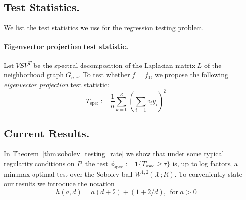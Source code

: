 \documentclass{article}
\newcommand{\1}{\mathbf{1}}
\theoremstyle{alden}
\theoremstyle{aldenthm}
\theoremstyle{definition}
\theoremstyle{remark}
\begin{document}
\subsection{Test Statistics.}
We list the test statistics we use for the regression testing problem.

\paragraph{Eigenvector projection test statistic.}
Let $VSV^T$ be the spectral decomposition of the Laplacian matrix $L$ of the neighborhood graph $G_{n,r}$. To test whether $f = f_0$, we propose the following \emph{eigenvector projection} test statistic:
\begin{equation}
\label{eqn:graph_spectral_projections}
T_{\mathrm{spec}} := \frac{1}{n} \sum_{k = 0}^{\kappa} \left(\sum_{i = 1} v_i y_i\right)^2
\end{equation}

\subsection{Current Results.}

In Theorem~\ref{thm:sobolev_testing_rate} we show that under some typical regularity conditions on $P$, the test $\phi_{\textrm{spec}} := \1\{T_{\mathrm{spec}} \geq \tau\}$ is, up to log factors, a minimax optimal test over the Sobolev ball $W^{1,2}(\mathcal{X};R)$. To conveniently state our results we introduce the notation
\begin{equation*}
h(a,d) = a(d+2) + (1 + 2/d),~~\textrm{for $a > 0$}
\end{equation*}
\end{document}
